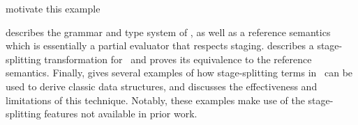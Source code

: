 \documentclass[preprint]{sigplanconf}
\begin{document}
\TODO motivate this example


 describes the grammar and type system of \lang, as well as a reference semantics which is essentially a partial evaluator that respects staging.  describes a stage-splitting transformation for \lang\ and proves its equivalence to the reference semantics.
Finally,  gives several examples of how stage-splitting terms in \lang\ can be used to derive classic data structures, and discusses the effectiveness and limitations of this technique.  Notably, these examples make use of the stage-splitting features not available in prior work.










\end{document}
